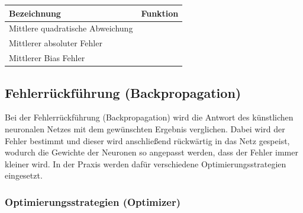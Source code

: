 	\begin{center}
	\begin{tabular}[t]{|l|l|}
		\hline
		\textbf{Bezeichnung} & \textbf{Funktion} \\
		\hline
		Mittlere quadratische Abweichung  &  
		\addvbuffer[0.05cm]{
			$ \textrm{MSE} = \frac{\sum_{i=1}^{n} (y_i - \hat{y_i})^2}{n} $
		} \\
		\hline
		Mittlerer absoluter Fehler  &  
		\addvbuffer[0.05cm]{
			$ \textrm{MAE} = \frac{\sum_{i=1}^{n} |y_i - \hat{y_i}|}{n} $
		} \\
		\hline
		Mittlerer Bias Fehler  &  
		\addvbuffer[0.05cm]{
			$ \textrm{MBE} = \frac{\sum_{i=1}^{n} (y_i - \hat{y_i})}{n} $
		} \\
		\hline
		
	\end{tabular}
	\end{center}

\subsection{Fehlerrückführung (Backpropagation)}

	Bei der Fehlerrückführung (Backpropagation) wird die Antwort des künstlichen neuronalen Netzes mit dem gewünschten Ergebnis verglichen. Dabei wird der Fehler bestimmt und dieser wird anschließend rückwärtig in das Netz gespeist, wodurch die Gewichte der Neuronen so angepasst werden, dass der Fehler immer kleiner wird. In der Praxis werden dafür verschiedene Optimierungsstrategien eingesetzt. \cite{rocketloop}
	
\subsubsection{Optimierungsstrategien (Optimizer)}

